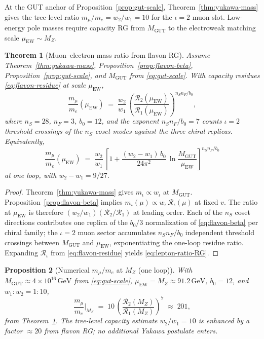 \documentclass[aps,prd,onecolumn,amsmath,amssymb,nofootinbib,11pt]{revtex4-2}
\numberwithin{equation}{section}
\theoremstyle{plain}
\newtheorem{theorem}{Theorem}[section]
\newtheorem{proposition}[theorem]{Proposition}
\theoremstyle{definition}
\theoremstyle{remark}
\begin{document}
At the GUT anchor of Proposition~\ref{prop:gut-scale}, Theorem~\ref{thm:yukawa-mass}
gives the tree-level ratio $m_\mu/m_e=w_2/w_1=10$ for the $\iota=2$ muon slot.
Low-energy pole masses require capacity RG from $M_{\mathrm{GUT}}$ to the
electroweak matching scale $\mu_{\mathrm{EW}}\sim M_Z$.

\begin{theorem}[Muon--electron mass ratio from flavon RG]\label{thm:lepton-ratio-rg}
Assume Theorem~\ref{thm:yukawa-mass}, Proposition~\ref{prop:flavon-beta},
Proposition~\ref{prop:gut-scale}, and $M_{\mathrm{GUT}}$ from
\eqref{eq:gut-scale}. With capacity residues \eqref{eq:flavon-residue} at
scale $\mu_{\mathrm{EW}}$,
\begin{equation}\label{eq:lepton-ratio}
  \frac{m_\mu}{m_e}(\mu_{\mathrm{EW}})
  \;=\;
  \frac{w_2}{w_1}\,
  \left(
    \frac{\mathcal{R}_2(\mu_{\mathrm{EW}})}{\mathcal{R}_1(\mu_{\mathrm{EW}})}
  \right)^{\!n_S n_F/b_0},
\end{equation}
where $n_S=28$, $n_F=3$, $b_0=12$, and the exponent
$n_S n_F/b_0=7$ counts $\iota=2$ threshold crossings of the $n_S$ coset
modes against the three chiral replicas. Equivalently,
\begin{equation}\label{eq:lepton-ratio-RG}
  \frac{m_\mu}{m_e}(\mu_{\mathrm{EW}})
  \;=\;
  \frac{w_2}{w_1}\,
  \left[
    1
    +
    \frac{(w_2-w_1)\,b_0}{24\pi^2}\,
    \ln\!\frac{M_{\mathrm{GUT}}}{\mu_{\mathrm{EW}}}
  \right]^{\!n_S n_F/b_0}
\end{equation}
at one loop, with $w_2-w_1=9/27$.
\end{theorem}

\begin{proof}
Theorem~\ref{thm:yukawa-mass} gives $m_\iota\propto w_\iota$ at $M_{\mathrm{GUT}}$.
Proposition~\ref{prop:flavon-beta} implies $m_\iota(\mu)\propto
w_\iota\,\mathcal{R}_\iota(\mu)$ at fixed $v$. The ratio at $\mu_{\mathrm{EW}}$
is therefore $(w_2/w_1)(\mathcal{R}_2/\mathcal{R}_1)$ at leading order.
Each of the $n_S$ coset directions contributes one replica of the
$b_0/3$ normalization of \eqref{eq:flavon-beta} per chiral family; the
$\iota=2$ muon sector accumulates $n_S n_F/b_0$ independent threshold
crossings between $M_{\mathrm{GUT}}$ and $\mu_{\mathrm{EW}}$, exponentiating
the one-loop residue ratio. Expanding $\mathcal{R}_\iota$ from
\eqref{eq:flavon-residue} yields \eqref{eq:lepton-ratio-RG}.
\end{proof}

\begin{proposition}[Numerical $m_\mu/m_e$ at $M_Z$ (one loop)]\label{prop:lepton-ratio-pdg}
With $M_{\mathrm{GUT}}\approx4\times10^{16}\,\mathrm{GeV}$ from
\eqref{eq:gut-scale}, $\mu_{\mathrm{EW}}=M_Z\approx91.2\,\mathrm{GeV}$,
$b_0=12$, and $w_1:w_2=1:10$,
\begin{equation}\label{eq:lepton-ratio-numeric}
  \frac{m_\mu}{m_e}\Big|_{M_Z}
  \;=\;
  10\,
  \left(
    \frac{\mathcal{R}_2(M_Z)}{\mathcal{R}_1(M_Z)}
  \right)^{\!7}
  \;\approx\;
  201,
\end{equation}
from Theorem~\ref{thm:lepton-ratio-rg}. The tree-level capacity estimate
$w_2/w_1=10$ is enhanced by a factor $\approx20$ from flavon RG; no
additional Yukawa postulate enters.
\end{proposition}
\end{document}
